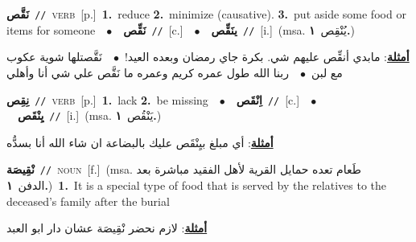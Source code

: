 \documentclass[10pt,a4paper,twoside]{article} %
\begin{document}
\begin{multicols}{2}
{\setlength\topsep{0pt}\textbf{\foreignlanguage{arabic}{نَقَّص}}\ {\color{gray}\texttt{//}\color{black}}\ \textsc{verb}\ [p.]\ \textbf{1.}~reduce  \textbf{2.}~minimize (causative).  \textbf{3.}~put aside some food or items for someone\ \ $\bullet$\ \ \setlength\topsep{0pt}\textbf{\foreignlanguage{arabic}{نَقِّص}}\ {\color{gray}\texttt{//}\color{black}}\ [c.]\ \ $\bullet$\ \ \setlength\topsep{0pt}\textbf{\foreignlanguage{arabic}{ينَقِّص}}\ {\color{gray}\texttt{//}\color{black}}\ [i.]\ \color{gray}(msa. \foreignlanguage{arabic}{يُنْقِص}~\foreignlanguage{arabic}{\textbf{١.}})\color{black}\  \begin{flushright}\color{gray}\foreignlanguage{arabic}{\textbf{\underline{\foreignlanguage{arabic}{أمثلة}}}: مابدي أنقِّص عليهم شي. بكرة جاي رمضان وبعده العيد!\ $\bullet$\ \  نَقَّصتلها شوية عكوب مع لبن\ $\bullet$\ \  ربنا الله طول عمره كريم وعمره ما نَقَّص علي شي أنا وأهلي}\end{flushright}\color{black}} \vspace{2mm}

{\setlength\topsep{0pt}\textbf{\foreignlanguage{arabic}{نِقِص}}\ {\color{gray}\texttt{//}\color{black}}\ \textsc{verb}\ [p.]\ \textbf{1.}~lack  \textbf{2.}~be missing\ \ $\bullet$\ \ \setlength\topsep{0pt}\textbf{\foreignlanguage{arabic}{اِنْقَص}}\ {\color{gray}\texttt{//}\color{black}}\ [c.]\ \ $\bullet$\ \ \setlength\topsep{0pt}\textbf{\foreignlanguage{arabic}{يِنْقَص}}\ {\color{gray}\texttt{//}\color{black}}\ [i.]\ \color{gray}(msa. \foreignlanguage{arabic}{يَنْقُص}~\foreignlanguage{arabic}{\textbf{١.}})\color{black}\  \begin{flushright}\color{gray}\foreignlanguage{arabic}{\textbf{\underline{\foreignlanguage{arabic}{أمثلة}}}: أي مبلغ بيِنْقَص عليك بالبضاعة ان شاء الله أنا بسدُّه}\end{flushright}\color{black}} \vspace{2mm}

{\setlength\topsep{0pt}\textbf{\foreignlanguage{arabic}{نْقِيصَة}}\ {\color{gray}\texttt{//}\color{black}}\ \textsc{noun}\ [f.]\ \color{gray}(msa. \foreignlanguage{arabic}{طَعام تعده حمايل القرية لأهل الفقيد مباشرة بعد الدفن}~\foreignlanguage{arabic}{\textbf{١.}})\color{black}\ \textbf{1.}~It is a special type of food that is served by the relatives to the deceased's family after the burial\  \begin{flushright}\color{gray}\foreignlanguage{arabic}{\textbf{\underline{\foreignlanguage{arabic}{أمثلة}}}: لازم نحضر نْقِيصَة عشان دار ابو العبد}\end{flushright}\color{black}} \vspace{2mm}


\end{multicols}
\end{document}
